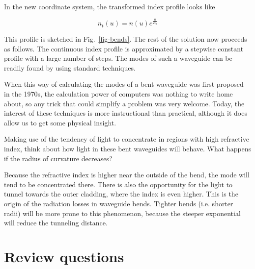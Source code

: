 In the new coordinate system, the transformed index profile looks like

\begin{equation}
n_t(u) = n(u)e^{\frac{u}{R_2}}
\end{equation} 

This profile is sketched in Fig.~\ref{fig-bends}. The rest of the solution now proceeds as follows. The continuous index profile is approximated by a stepwise constant profile with a large number of steps. The modes of such a waveguide can be readily found by using standard techniques.

When this way of calculating the modes of a bent waveguide was first proposed in the 1970s, the calculation power of computers was nothing to write home about, so any trick that could simplify a problem was very welcome. Today, the interest of these techniques is more instructional than practical, although it does allow us to get some physical insight.

\begin{cue}
Making use of the tendency of light to concentrate in regions with high refractive index, think about how light in these bent waveguides will behave. What happens if the radius of curvature decreases?  
\end{cue}

Because the refractive index is higher near the outside of the bend, the mode will tend to be concentrated there. There is also the opportunity for the light to tunnel towards the outer cladding, where the index is even higher. This is the origin of the radiation losses in waveguide bends. Tighter bends (i.e. shorter radii) will be more prone to this phenomenon, because the steeper exponential will reduce the tunneling distance.


\section*{Review questions}

